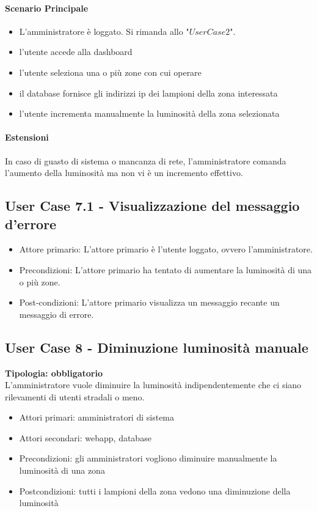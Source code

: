 \documentclass[12pt]{article}
\begin{document}
\paragraph{Scenario Principale}
\begin{itemize}
	\item L'amministratore è loggato. Si rimanda allo "$User Case 2$".
	\item l'utente accede alla dashboard
	\item l'utente seleziona una o più zone con cui operare
	\item il database fornisce gli indirizzi ip dei lampioni della zona interessata
	\item l'utente incrementa manualmente la luminosità della zona selezionata
\end{itemize}

\paragraph{Estensioni} In caso di guasto di sistema o mancanza di rete, l'amministratore comanda l'aumento della luminosità ma non vi è un incremento effettivo.

\subsection{User Case 7.1 - Visualizzazione del messaggio d'errore}
\begin{itemize}
	\item Attore primario: L'attore primario è l'utente loggato, ovvero l'amministratore.
	\item Precondizioni: L'attore primario ha tentato di aumentare la luminosità di una o più zone.
	\item Post-condizioni: L'attore primario visualizza un messaggio recante un messaggio di errore.
\end{itemize}

\subsection{User Case 8 - Diminuzione luminosità manuale}
\textbf{Tipologia: obbligatorio} \\
L'amministratore vuole diminuire la luminosità indipendentemente che ci siano rilevamenti di utenti stradali o meno.
\begin{itemize}
	\item Attori primari: amministratori di sistema
	\item Attori secondari: webapp, database
	\item Precondizioni: gli amministratori vogliono diminuire manualmente la luminosità di una zona
	\item Postcondizioni: tutti i lampioni della zona vedono una diminuzione della luminosità
\end{itemize}
\end{document}
